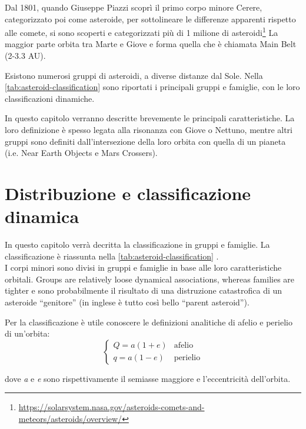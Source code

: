 \documentclass[a4paper,11pt,openright]{book}
\begin{document}
Dal 1801, quando Giuseppe Piazzi scoprì il primo corpo minore Cerere, categorizzato poi come asteroide, per sottolineare le differenze apparenti rispetto alle comete, si sono scoperti e categorizzati più di 1 milione di asteroidi\footnote{\href{https://solarsystem.nasa.gov/asteroids-comets-and-meteors/asteroids/overview/}{https://solarsystem.nasa.gov/asteroids-comets-and-meteors/asteroids/overview/}} La maggior parte orbita tra Marte e Giove e forma quella che è chiamata Main Belt (2-3.3 AU).

Esistono numerosi gruppi di asteroidi, a diverse distanze dal Sole. Nella \cref{tab:asteroid-classification} sono riportati i principali gruppi e famiglie, con le loro classificazioni dinamiche.

In questo capitolo verranno descritte brevemente le principali caratteristiche. La loro definizione è spesso legata alla risonanza con Giove o Nettuno, mentre altri gruppi sono definiti dall'intersezione della loro orbita con quella di un pianeta (i.e. Near Earth Objects e Mars Crossers).

\section{Distribuzione e classificazione dinamica}
In questo capitolo verrà decritta la classificazione in gruppi e famiglie.
La classificazione è riassunta nella \cref{tab:asteroid-classification} .\\
I corpi minori sono divisi in gruppi e famiglie in base alle loro caratteristiche orbitali. 
Groups are relatively loose dynamical associations, whereas families are tighter e sono probabilmente il risultato di una distruzione catastrofica di un asteroide “genitore” (in inglese è tutto così bello “parent asteroid”).

Per la classificazione è utile conoscere le definizioni analitiche di afelio e perielio di un'orbita:
\begin{equation}
    \begin{cases}
        Q=a(1+e) &\text{afelio}\\
        q=a(1-e) &\text{perielio}
    \end{cases}
\end{equation}

dove \textit{a} e \textit{e} sono rispettivamente il semiasse maggiore e l'eccentricità dell'orbita.
\end{document}
